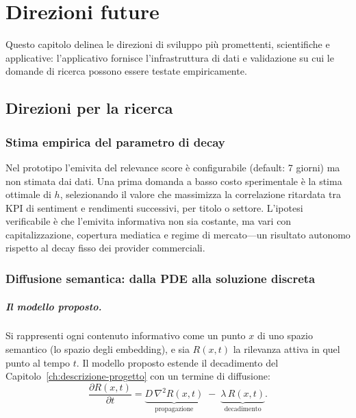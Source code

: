 \chapter{Direzioni future}
\label{ch:direzioni-future}

Questo capitolo delinea le direzioni di sviluppo più promettenti, scientifiche e applicative: l'applicativo fornisce l'infrastruttura di dati e validazione su cui le domande di ricerca possono essere testate empiricamente.

\section{Direzioni per la ricerca}

\subsection{Stima empirica del parametro di decay}

Nel prototipo l'emivita del relevance score è configurabile (default: 7 giorni) ma non stimata dai dati.
Una prima domanda a basso costo sperimentale è la stima ottimale di $h$, selezionando il valore che massimizza la correlazione ritardata tra KPI di sentiment e rendimenti successivi, per titolo o settore.
L'ipotesi verificabile è che l'emivita informativa non sia costante, ma vari con capitalizzazione, copertura mediatica e regime di mercato---un risultato autonomo rispetto al decay fisso dei provider commerciali.

\subsection{Diffusione semantica: dalla PDE alla soluzione discreta}
\label{sec:soluzione-discreta}

\paragraph{Il modello proposto.}
Si rappresenti ogni contenuto informativo come un punto $x$ di uno spazio semantico (lo spazio degli embedding), e sia $R(x,t)$ la rilevanza attiva in quel punto al tempo $t$.
Il modello proposto estende il decadimento del Capitolo~\ref{ch:descrizione-progetto} con un termine di diffusione:
\[
\frac{\partial R(x, t)}{\partial t} = \underbrace{D\, \nabla^2 R(x, t)}_{\text{propagazione}} \; - \; \underbrace{\lambda\, R(x, t)}_{\text{decadimento}}.
\]

